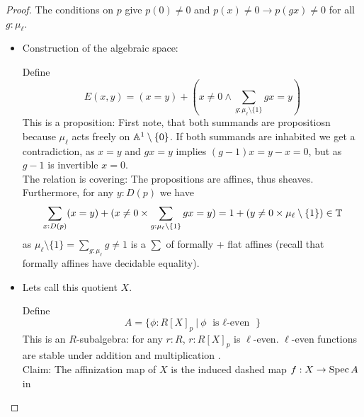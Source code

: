 \begin{proof}
	The conditions on $p$ give $p(0) \neq 0$ and $p(x) \neq 0 \to p(gx) \neq 0$ for all $g : \mu_\ell$.

	\begin{itemize}
		\item Construction of the algebraic space:
	
	Define
	\[
	E(x,y) = (x = y) + (x \neq 0 \land \sum_{g : \mu_\ell \setminus \{1\}} gx = y)
	\]
	This is a proposition: First note, that both summands are propositiosn because $\mu_\ell$ acts freely on $\mathbb{A}^1 \setminus \{0\}$. If both summands are inhabited we get a contradiction, as $x = y$ and $gx = y$ implies $(g-1) x = y - x = 0$, but as $g-1$ is invertible $x = 0$. \\
	The relation is covering: 
	The propositions are affines, thus sheaves. Furthermore, for any $y : D(p)$ we have
	\[
	\sum_{x : D(p)}  (x = y) + (x \neq 0 \times \sum_{g : \mu_\ell \setminus \{1\}} gx = y) = 1 + (y \neq 0 \times \mu_\ell \setminus \{1\}) \in \mathbb{T}
	\]
	as $\mu_\ell \setminus \{1\} = \sum_{g : \mu_\ell} g \neq 1$ is a $\sum$ of formally \etale + flat affines (recall that formally \etale affines have decidable equality).

\item 	Lets call this quotient $X$.

Define 
\[
A = \{\phi : R[X]_p \ | \ \phi \text{  is $\ell$-even }\}
\]
This is an $R$-subalgebra: for any $r : R$, $r : R[X]_p$ is $\ell$-even. $\ell$-even functions are stable under addition and multiplication . \\

	Claim: The affinization map of $X$ is the induced dashed map $f : X \to \operatorname{Spec} A$ in
	

\end{itemize}
\end{proof}
